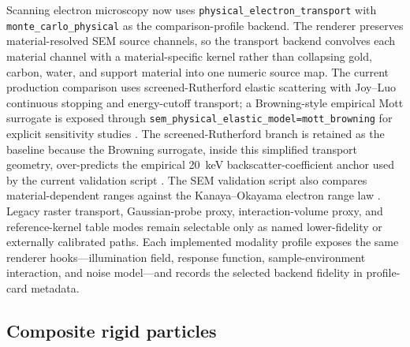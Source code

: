 Scanning electron microscopy now uses \texttt{physical\_electron\_transport} with \texttt{monte\_carlo\_physical} as the comparison-profile backend. The renderer preserves material-resolved SEM source channels, so the transport backend convolves each material channel with a material-specific kernel rather than collapsing gold, carbon, water, and support material into one numeric source map. The current production comparison uses screened-Rutherford elastic scattering with Joy--Luo continuous stopping and energy-cutoff transport; a Browning-style empirical Mott surrogate is exposed through \texttt{sem\_physical\_elastic\_model=\allowbreak mott\_browning} for explicit sensitivity studies \cite{joy-luo-stopping,browning-mott-cross-sections}. The screened-Rutherford branch is retained as the baseline because the Browning surrogate, inside this simplified transport geometry, over-predicts the empirical 20~keV backscatter-coefficient anchor used by the current validation script \cite{tabata-backscatter}. The SEM validation script also compares material-dependent ranges against the Kanaya--Okayama electron range law \cite{kanaya-okayama-range}. Legacy raster transport, Gaussian-probe proxy, interaction-volume proxy, and reference-kernel table modes remain selectable only as named lower-fidelity or externally calibrated paths. Each implemented modality profile exposes the same renderer hooks---illumination field, response function, sample-environment interaction, and noise model---and records the selected backend fidelity in profile-card metadata.

\subsection{Composite rigid particles}

